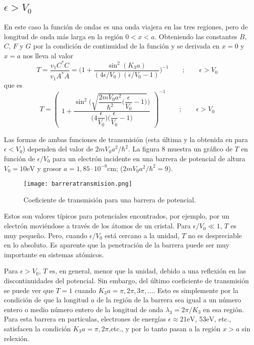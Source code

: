 \documentclass[12pt,a4paper]{article}
\def\e{{\epsilon}} %
\begin{document}
\subsection{$\e>V_{0}$}

En este caso la función de ondas es una onda viajera en las tres regiones, pero de longitud de onda más larga en la región $0<x<a$. Obteniendo las constantes $B$, $C$, $F$ y $G$ por la condición de continuidad de la función y se derivada en $x=0$ y $x=a$ nos lleva al valor
\[ T=\frac{v_{1}C^{\ast}C}{v_{1}A^{\ast}A}=\bigg( 1+\frac{\sin^{2}(K_{3}a)}{(4\e/V_{0})(\e/V_{0}-1)} \bigg)^{-1} \qquad ; \qquad \e > V_{0}\]
que es
\[
T=
\left(
\begin{array}{l}
1+\dfrac{ \sin^{2} \bigg( \sqrt{ \dfrac{2mV_{0}a^{2}}{\hbar^{2}} \bigg( \dfrac{\e}{V_{0}} -1 \bigg) } \bigg) }{ \bigg( 4 \dfrac{\e}{V_{0}} \bigg) \bigg( \dfrac{\e}{V_{0}} - 1 \bigg) }
\end{array}
\right)^{-1} \qquad ; \qquad \e>V_{0}
\]

Las formas de ambas funciones de transmisión (esta última y la obtenida en para $\e<V_{0}$) dependen del valor de $2mV_{0}a^{2}/\hbar^{2}$. La figura 8 muestra un gráfico de $T$ en función de $\e/V_{0}$ para un electrón incidente en una barrera de potencial de altura $V_{0}=10\textrm{eV}$ y grosor $a=1,85 \cdot 10^{-8} \textrm{cm}$; ($2mV_{0}a^{2}/\hbar^{2}=9$).

\begin{figure}[ht!]
\begin{center}
\texttt{[image: barreratransmision.png]}
\caption{Coeficiente de transmisión para una barrera de potencial.}
\end{center}
\end{figure}

Estos son valores típicos para potenciales encontrados, por ejemplo, por un electrón moviéndose a través de los átomos de un cristal. Para $\e/V_{0} \ll 1$, $T$ es muy pequeño. Pero, cuando $\e/V_{0}$ está cercano a la unidad, $T$ no es despreciable en lo absoluto. Es aparente que la penetración de la barrera puede ser muy importante en sistemas atómicos.

Para $\e>V_{0}$, $T$ es, en general, menor que la unidad, debido a una reflexión en las discontinuidades del potencial. Sin embargo, del último coeficiente de transmisión se puede ver que $T=1$ cuando $K_{3}a=\pi,2\pi,3\pi,\ldots$. Esto es simplemente por la condición de que la longitud $a$ de la región de la barrera sea igual a un número entero o medio número entero de la longitud de onda $\lambda _{3}=2\pi/K_{3}$ en esa región. Para esta barrera en particulas, electrones de energías $\e \approx 21 \textrm{eV}$, $53\textrm{eV}$, etc., satisfacen la condición $K_{3}a=\pi,2\pi$,etc., y por lo tanto pasan a la región $x>a$ sin relexión.
\end{document}
